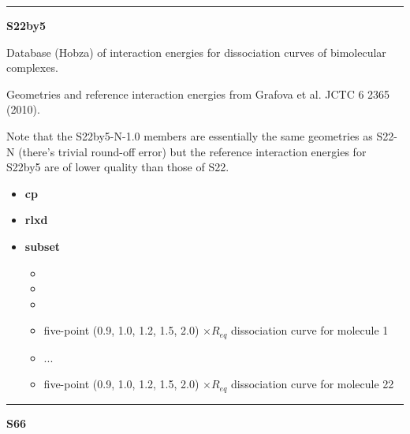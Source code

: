 \documentclass[letterpaper,10pt,english]{sphinxmanual}
\begin{document}
\bigskip\hrule{}\bigskip

\label{index:module-S22by5}
\textbf{S22by5}

\begin{DUlineblock}{0em}
\item[] Database (Hobza) of interaction energies for dissociation curves of bimolecular complexes.
\item[] Geometries and reference interaction energies from Grafova et al. JCTC 6 2365 (2010).
\item[] Note that the S22by5-N-1.0 members are essentially the same geometries as S22-N (there's trivial round-off error) but the reference interaction energies for S22by5 are of lower quality than those of S22.
\end{DUlineblock}
\begin{itemize}
\item {} 
\textbf{cp}   \textbar{}\textbar{} 

\item {} 
\textbf{rlxd} 

\item {} 
\textbf{subset}
\begin{itemize}
\item {} 

\item {} 

\item {} 

\item {} 
 five-point (0.9, 1.0, 1.2, 1.5, 2.0) $\times R_{eq}$ dissociation curve for molecule 1

\item {} 
...

\item {} 
 five-point (0.9, 1.0, 1.2, 1.5, 2.0) $\times R_{eq}$ dissociation curve for molecule 22

\end{itemize}

\end{itemize}


\bigskip\hrule{}\bigskip

\label{index:module-S66}
\textbf{S66}
\end{document}
